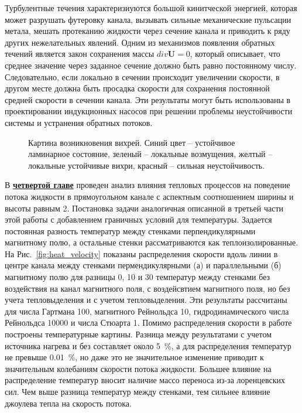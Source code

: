 Турбулентные течения характеризиуются большой кинитческой энергией, которая может разрушать футеровку канала, вызывать сильные механические пульсации метала, мешать протеканию жидкости через сечение канала и приводить к ряду других нежелательных явлений. Одним из механизмов появления обратных течений является закон сохранения массы $div \mathbf{U} = 0$, который описывает, что среднее значение через заданное сечение должно быть равно постоянному числу. Следовательно, если локально в сечении происходит увеличении скорости, в другом месте должна быть просадка скорости для сохранения постоянной средней скорости в сечении канала. Эти результаты могут быть использованы в проектировании индукционных насосов при решении проблемы неустойчивости системы и устранения обратных потоков. 

\begin{figure}[h]
	\caption{Картина возникновения вихрей. Синий цвет -- устойчивое ламинарное состояние, зеленый -- локальные возмущения, желтый -- локальные устойчивые вихри, красный -- сильная неустойчивость.}
	\label{fig:map_instability}
\end{figure}


В \underline{\textbf{четвертой главе}} проведен анализ влияния тепловых процессов на поведение потока жидкости в прямоугольном канале с аспектным соотношением ширины и высоты равным 2. Постановка задачи аналогичная описанной в третьей части этой работы с добавлением граничных условий для температуры. Задается постоянная разность температур между стенками перпендикулярными магнитному полю, а остальные стенки рассматриваются как теплоизолированные. На Рис.~\ref{fig:heat_velocity} показаны распределения скорости вдоль линии в центре канала между стенками пермендикулярными (а) и параллельными (б) магнитному полю для разницы 0, 10 и 30 температур между стенками без воздействия на канал магнитного поля, с воздейсвтием магнитного поля, но без учета тепловыделения и с учетом тепловыделения. Эти результаты рассчитаны для числа Гартмана 100, магнитного Рейнольдса 10, гидродинамического числа Рейнольдса 10000 и числа Стюарта 1. Помимо распределения скорости в работе построены температурные картины. Разница между результатами с учетом источника нагрева и без составляет около 5~\%, а для распределения температур не превыше 0.01~\%, но даже это не значительное изменение приводит к значительным колебаниям скорости потока жидкости. Большее влияние на распределение температур вносит наличие массо переноса из-за лоренцевских сил. Чем выше разница температур между стенками, тем сильнее влияние джоулева тепла на скорость потока. 

